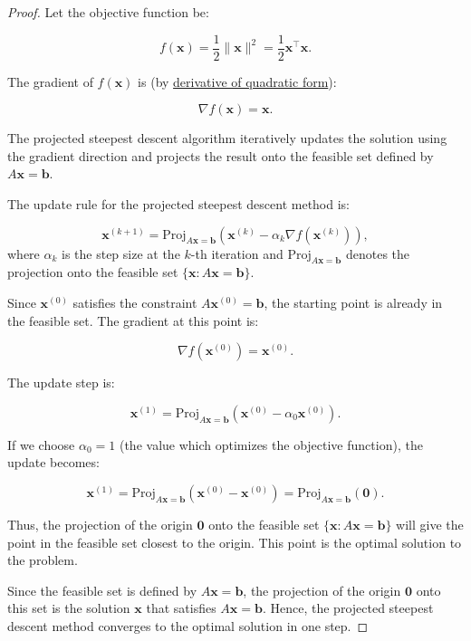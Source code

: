 \documentclass{article}
\begin{document}
\begin{proof}
    Let the objective function be:

    \[
    f(\mathbf{x}) = \frac{1}{2} \|\mathbf{x}\|^2 = \frac{1}{2} \mathbf{x}^\top \mathbf{x}.
    \]

    The gradient of \( f(\mathbf{x}) \) is (by \href{https://michael.orlitzky.com/articles/the_derivative_of_a_quadratic_form.xhtml}{derivative of quadratic form}):

    \[
    \nabla f(\mathbf{x}) = \mathbf{x}.
    \]

    The projected steepest descent algorithm iteratively updates the solution using the gradient direction and projects the result onto the feasible set defined by \( A \mathbf{x} = \mathbf{b} \).

    The update rule for the projected steepest descent method is:

    \[
    \mathbf{x}^{(k+1)} = \text{Proj}_{A\mathbf{x}=\mathbf{b}} \left( \mathbf{x}^{(k)} - \alpha_k \nabla f(\mathbf{x}^{(k)}) \right),
    \]
    where \( \alpha_k \) is the step size at the \( k \)-th iteration and \( \text{Proj}_{A\mathbf{x}=\mathbf{b}} \) denotes the projection onto the feasible set \( \{ \mathbf{x} : A \mathbf{x} = \mathbf{b} \} \).

    Since \( \mathbf{x}^{(0)} \) satisfies the constraint \( A \mathbf{x}^{(0)} = \mathbf{b} \), the starting point is already in the feasible set. The gradient at this point is:

    \[
    \nabla f(\mathbf{x}^{(0)}) = \mathbf{x}^{(0)}.
    \]

    The update step is:

    \[
    \mathbf{x}^{(1)} = \text{Proj}_{A\mathbf{x}=\mathbf{b}} \left( \mathbf{x}^{(0)} - \alpha_0 \mathbf{x}^{(0)} \right).
    \]

    If we choose \( \alpha_0 = 1 \) (the value which optimizes the objective function), the update becomes:

    \[
    \mathbf{x}^{(1)} = \text{Proj}_{A\mathbf{x}=\mathbf{b}} \left( \mathbf{x}^{(0)} - \mathbf{x}^{(0)} \right) = \text{Proj}_{A\mathbf{x}=\mathbf{b}} \left( \mathbf{0} \right).
    \]

    Thus, the projection of the origin \( \mathbf{0} \) onto the feasible set \( \{ \mathbf{x} : A \mathbf{x} = \mathbf{b} \} \) will give the point in the feasible set closest to the origin. This point is the optimal solution to the problem.

    Since the feasible set is defined by \( A \mathbf{x} = \mathbf{b} \), the projection of the origin \( \mathbf{0} \) onto this set is the solution \( \mathbf{x} \) that satisfies \( A \mathbf{x} = \mathbf{b} \). Hence, the projected steepest descent method converges to the optimal solution in one step.
\end{proof}
\end{document}
